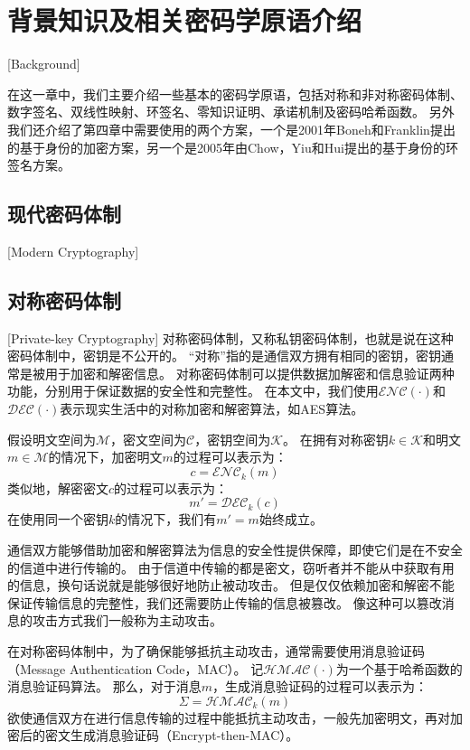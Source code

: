 

\chapter{背景知识及相关密码学原语介绍}[Background]

在这一章中，我们主要介绍一些基本的密码学原语，包括对称和非对称密码体制、数字签名、双线性映射、环签名、零知识证明、承诺机制及密码哈希函数。
另外我们还介绍了第四章中需要使用的两个方案，一个是2001年Boneh和Franklin提出的基于身份的加密方案\cite{boneh2001identity}，另一个是2005年由Chow，Yiu和Hui提出的基于身份的环签名方案\cite{chow2005efficient}。 

\section{现代密码体制}[Modern Cryptography]

\section{对称密码体制}[Private-key Cryptography]
对称密码体制，又称私钥密码体制，也就是说在这种密码体制中，密钥是不公开的。
“对称”指的是通信双方拥有相同的密钥，密钥通常是被用于加密和解密信息。
对称密码体制可以提供数据加解密和信息验证两种功能，分别用于保证数据的安全性和完整性。
在本文中，我们使用$\mathcal{ENC}(\cdot)$和$\mathcal{DEC}(\cdot)$表示现实生活中的对称加密和解密算法，如AES算法。

假设明文空间为$\mathcal{M}$，密文空间为$\mathcal{C}$，密钥空间为$\mathcal{K}$。
在拥有对称密钥$k\in\mathcal{K}$和明文$m\in\mathcal{M}$的情况下，加密明文$m$的过程可以表示为：
\begin{equation}
c=\mathcal{ENC}_k(m)
\end{equation}
类似地，解密密文$c$的过程可以表示为：
\begin{equation}
m'=\mathcal{DEC}_k(c)
\end{equation}
在使用同一个密钥$k$的情况下，我们有$m'=m$始终成立。

通信双方能够借助加密和解密算法为信息的安全性提供保障，即使它们是在不安全的信道中进行传输的。
由于信道中传输的都是密文，窃听者并不能从中获取有用的信息，换句话说就是能够很好地防止被动攻击。
但是仅仅依赖加密和解密不能保证传输信息的完整性，我们还需要防止传输的信息被篡改。
像这种可以篡改消息的攻击方式我们一般称为主动攻击。

在对称密码体制中，为了确保能够抵抗主动攻击，通常需要使用消息验证码（Message Authentication Code，MAC）。
记$\mathcal{HMAC}(\cdot)$为一个基于哈希函数的消息验证码算法。
那么，对于消息$m$，生成消息验证码的过程可以表示为：
\begin{equation}
\Sigma=\mathcal{HMAC}_k(m)
\end{equation}
欲使通信双方在进行信息传输的过程中能抵抗主动攻击，一般先加密明文，再对加密后的密文生成消息验证码（Encrypt-then-MAC）\cite{krawczyk2001order}。

